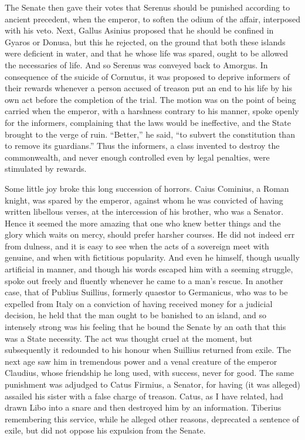 The Senate then gave their votes that Serenus should be punished according to ancient precedent, when the emperor, to soften the odium of the affair, interposed with his veto. Next, Gallus Asinius proposed that he should be confined in Gyaros or Donusa, but this he rejected, on the ground that both these islands were deficient in water, and that he whose life was spared, ought to be allowed the necessaries of life. And so Serenus was conveyed back to Amorgus. In consequence of the suicide of Cornutus, it was proposed to deprive informers of their rewards whenever a person accused of treason put an end to his life by his own act before the completion of the trial. The motion was on the point of being carried when the emperor, with a harshness contrary to his manner, spoke openly for the informers, complaining that the laws would be ineffective, and the State brought to the verge of ruin. ``Better,'' he said, ``to subvert the constitution than to remove its guardians.'' Thus the informers, a class invented to destroy the commonwealth, and never enough controlled even by legal penalties, were stimulated by rewards.


Some little joy broke this long succession of horrors. Caius Cominius, a Roman knight, was spared by the emperor, against whom he was convicted of having written libellous verses, at the intercession of his brother, who was a Senator. Hence it seemed the more amazing that one who knew better things and the glory which waits on mercy, should prefer harsher courses. He did not indeed err from dulness, and it is easy to see when the acts of a sovereign meet with genuine, and when with fictitious popularity. And even he himself, though usually artificial in manner, and though his words escaped him with a seeming struggle, spoke out freely and fluently whenever he came to a man's rescue. In another case, that of Publius Suillius, formerly quaestor to Germanicus, who was to be expelled from Italy on a conviction of having received money for a judicial decision, he held that the man ought to be banished to an island, and so intensely strong was his feeling that he bound the Senate by an oath that this was a State necessity. The act was thought cruel at the moment, but subsequently it redounded to his honour when Suillius returned from exile. The next age saw him in tremendous power and a venal creature of the emperor Claudius, whose friendship he long used, with success, never for good. The same punishment was adjudged to Catus Firmius, a Senator, for having (it was alleged) assailed his sister with a false charge of treason. Catus, as I have related, had drawn Libo into a snare and then destroyed him by an information. Tiberius remembering this service, while he alleged other reasons, deprecated a sentence of exile, but did not oppose his expulsion from the Senate.

